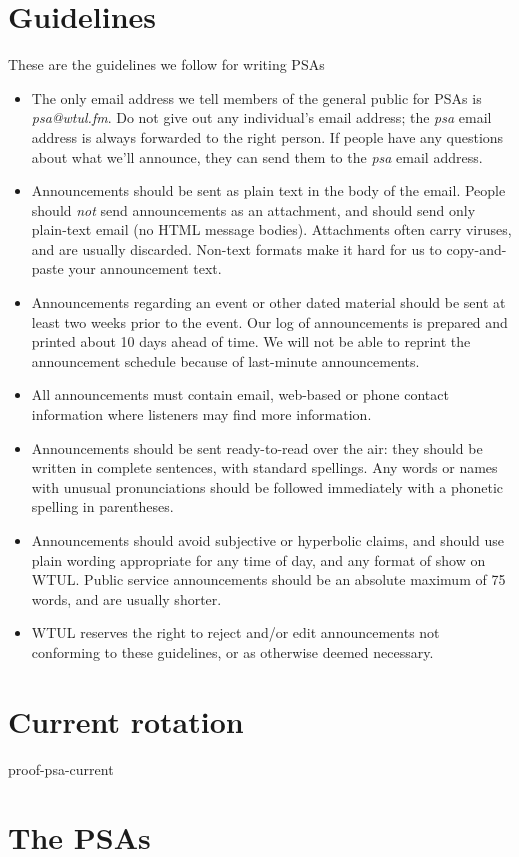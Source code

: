 \documentclass [11pt]{article}
\begin{document}
\section {Guidelines}
These are the guidelines we follow for writing PSAs
\begin {itemize}
\item The only email address we tell members of the general public for PSAs is \textsl {psa@wtul.fm}\enspace . Do not give out any individual's email address; the \textsl {psa} email address is always forwarded to the right person. If people have any questions about what we'll announce, they can send them to the \textsl {psa} email address.
\item Announcements should be sent as plain text in the body of the email. People should \emph {not} send announcements as an attachment, and should send only plain-text email (no HTML message bodies). Attachments often carry viruses, and are usually discarded. Non-text formats make it hard for us to copy-and-paste your announcement text.
\item Announcements regarding an event or other dated material should be sent at least two weeks prior to the event. Our log of announcements is prepared and printed about 10 days ahead of time. We will not be able to reprint the announcement schedule because of last-minute announcements.
\item All announcements must contain email, web-based or phone contact information where listeners may find more information.
\item Announcements should be sent ready-to-read over the air: they should be written in complete sentences, with standard spellings. Any words or names with unusual pronunciations should be followed immediately with a phonetic spelling in parentheses.
\item Announcements should avoid subjective or hyperbolic claims, and should use plain wording appropriate for any time of day, and any format of show on WTUL. Public service announcements should be an absolute maximum of 75 words, and are usually shorter.
\item WTUL reserves the right to reject and/or edit announcements not conforming to these guidelines, or as otherwise deemed necessary.
\end {itemize}
\section {Current rotation}
 {proof-psa-current}


\section {The PSAs}
\end{document}
